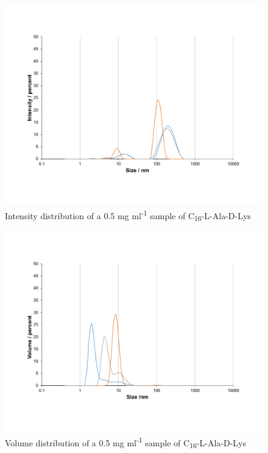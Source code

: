 \begin{figure} [ht!]
\centering
\includegraphics[scale=0.47]{DLS/KAT1_30_0_5mg_ml-1_size.pdf}
\caption{Intensity distribution of a 0.5 mg ml\textsuperscript{-1} sample of C\textsubscript{16}-L-Ala-D-Lys}
\label{size_distribution_KAT1.30_0.5}
\end{figure}
\begin{figure} [ht!]
\centering
\includegraphics[scale=0.47]{DLS/KAT1_30_0_5mg_ml-1_volume.pdf}
\caption{Volume distribution of a 0.5 mg ml\textsuperscript{-1} sample of C\textsubscript{16}-L-Ala-D-Lys}
\label{Volume_distribution_KAT1.30_0.5}
\end{figure}
\newpage


